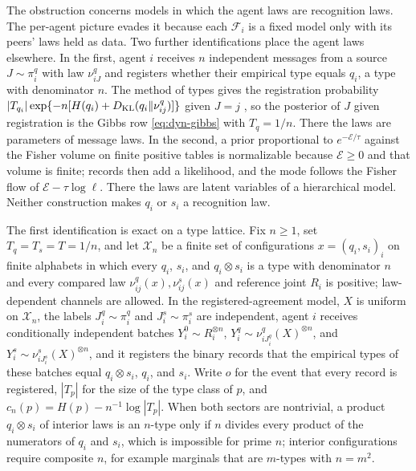 The obstruction concerns models in which the agent laws are recognition laws. The per-agent picture evades it because each $\mathcal F_i$ is a fixed model only with its peers' laws held as data. Two further identifications place the agent laws elsewhere. In the first, agent $i$ receives $n$ independent messages from a source $J\sim\pi_i^q$ with law $\nu^q_{iJ}$ and registers whether their empirical type equals $q_i$, a type with denominator $n$. The method of types gives the registration probability $|T_{q_i}|\exp\{-n[H(q_i)+D_{\mathrm{KL}}(q_i\Vert\nu^q_{ij})]\}$ given $J=j$ \citep[Theorem 11.1.2]{CoverThomas2006}, so the posterior of $J$ given registration is the Gibbs row \cref{eq:dyn-gibbs} with $T_q=1/n$. There the laws are parameters of message laws. In the second, a prior proportional to $e^{-\mathcal E/\tau}$ against the Fisher volume on finite positive tables is normalizable because $\mathcal E\geq0$ and that volume is finite; records then add a likelihood, and the mode follows the Fisher flow of $\mathcal E-\tau\log\ell$. There the laws are latent variables of a hierarchical model. Neither construction makes $q_i$ or $s_i$ a recognition law.

The first identification is exact on a type lattice. Fix $n\geq1$, set $T_q=T_s=T=1/n$, and let $\mathcal X_n$ be a finite set of configurations $x=(q_i,s_i)_i$ on finite alphabets in which every $q_i$, $s_i$, and $q_i\otimes s_i$ is a type with denominator $n$ and every compared law $\nu^q_{ij}(x),\nu^s_{ij}(x)$ and reference joint $R_i$ is positive; law-dependent channels are allowed. In the registered-agreement model, $X$ is uniform on $\mathcal X_n$, the labels $J^q_i\sim\pi^q_i$ and $J^s_i\sim\pi^s_i$ are independent, agent $i$ receives conditionally independent batches $Y^0_i\sim R_i^{\otimes n}$, $Y^q_i\sim\nu^q_{iJ^q_i}(X)^{\otimes n}$, and $Y^s_i\sim\nu^s_{iJ^s_i}(X)^{\otimes n}$, and it registers the binary records that the empirical types of these batches equal $q_i\otimes s_i$, $q_i$, and $s_i$. Write $o$ for the event that every record is registered, $|T_p|$ for the size of the type class of $p$, and $c_n(p)=H(p)-n^{-1}\log|T_p|$. When both sectors are nontrivial, a product $q_i\otimes s_i$ of interior laws is an $n$-type only if $n$ divides every product of the numerators of $q_i$ and $s_i$, which is impossible for prime $n$; interior configurations require composite $n$, for example marginals that are $m$-types with $n=m^2$.

